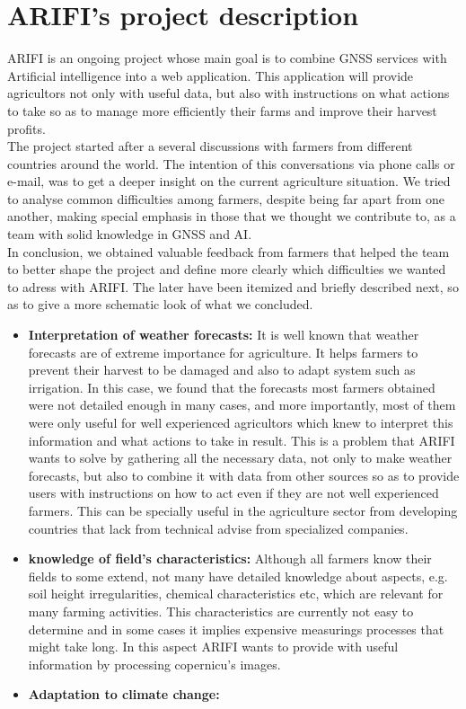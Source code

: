 \section{ARIFI's project description}
ARIFI is an ongoing project whose main goal is to combine GNSS services with Artificial intelligence into a web application. This application will provide agricultors not only with useful data, but also with instructions on what actions to take so as to manage more efficiently their farms and improve their harvest profits.\\
%
%
The project started after a several discussions with farmers from different countries around the world. The intention of this conversations via phone calls or e-mail, was to get a deeper insight on the current agriculture situation. We tried to analyse common difficulties among farmers, despite being far apart from one another, making special emphasis in those that we thought we contribute to, as a team with solid knowledge in GNSS and AI.\\
%
%
In conclusion, we obtained valuable feedback from farmers that helped the team to better shape the project and define more clearly which difficulties we wanted to adress with ARIFI. The later have been itemized and briefly described next, so as to give a more schematic look of what we concluded.
\begin{itemize}
    \item \textbf{Interpretation of weather forecasts:} It is well known that weather forecasts are of extreme importance for agriculture. It helps farmers to prevent their harvest to be damaged and also to adapt system such as irrigation. In this case, we found that the forecasts most farmers obtained were not detailed enough in many cases, and more importantly, most of them were only useful for well experienced agricultors which knew to interpret this information and what actions to take in result. This is a problem that ARIFI wants to solve by gathering all the necessary data, not only to make weather forecasts, but also to combine it with data from other sources so as to provide users with instructions on how to act even if they are not well experienced farmers. This can be specially useful in the agriculture sector from developing countries that lack from technical advise from specialized companies. 
    \item \textbf{knowledge of field's characteristics:} Although all farmers know their fields to some extend, not many have detailed knowledge about aspects, e.g. soil height irregularities, chemical characteristics etc, which are relevant for many farming activities. This characteristics are currently not easy to determine and in some cases it implies expensive measurings processes that might take long. In this aspect ARIFI wants to provide with useful information by processing copernicu's images.
    \item \textbf{Adaptation to climate change:}
\end{itemize}


